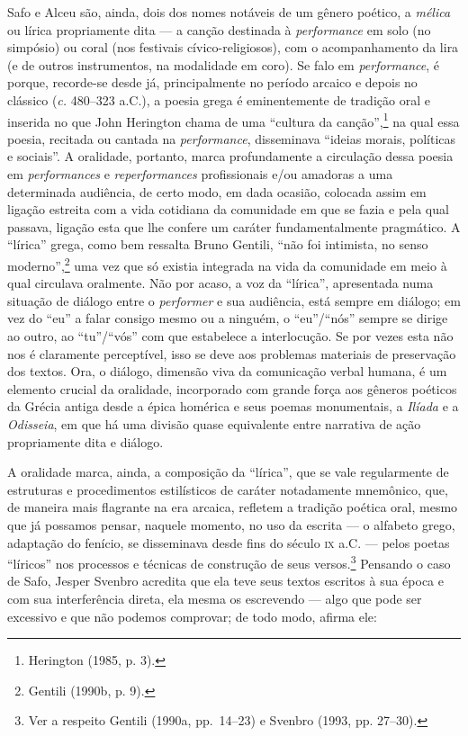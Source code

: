 Safo e Alceu são, ainda, dois dos nomes notáveis de um gênero poético, a
\textit{mélica} ou lírica propriamente dita --- a canção destinada à
\textit{performance} em solo (no simpósio) ou coral (nos festivais
cívico-religiosos), com o acompanhamento da lira (e de outros instrumentos, na
modalidade em coro). Se falo em \textit{performance}, é porque, recorde-se
desde já, principalmente no período arcaico e depois no clássico (\textit{c.}
480--323 a.C.), a poesia grega é eminentemente de tradição oral e inserida no
que John Herington chama de uma “cultura da canção”,\footnote{ Herington (1985, p. 3).} na
qual essa poesia, recitada ou cantada na \textit{performance}, disseminava
“ideias morais, políticas e sociais”. A oralidade, portanto, marca
profundamente a circulação dessa poesia em \textit{performances} e
\textit{reperformances} profissionais e/ou amadoras a uma determinada
audiência, de certo modo, em dada ocasião, colocada assim em ligação estreita
com a vida cotidiana da comunidade em que se fazia e pela qual passava, ligação
esta que lhe confere um caráter fundamentalmente pragmático. A “lírica” grega,
como bem ressalta Bruno Gentili, “não foi intimista, no senso
moderno”,\footnote{ Gentili (1990b, p. 9).} uma vez que só existia integrada na
vida da comunidade em meio à qual
circulava oralmente. Não por acaso, a voz da “lírica”, apresentada numa
situação de diálogo entre o \textit{performer} e sua audiência, está sempre em
diálogo; em vez do “eu” a falar consigo mesmo ou a ninguém, o “eu”/“nós” sempre
se dirige ao outro, ao “tu”/“vós” com que estabelece a interlocução. Se por
vezes esta não nos é claramente perceptível, isso se deve aos problemas
materiais de preservação dos textos. Ora, o diálogo, dimensão viva da
comunicação verbal humana, é um elemento crucial da oralidade, incorporado com
grande força aos gêneros poéticos da Grécia antiga desde a épica homérica e
seus poemas monumentais, a \textit{Ilíada} e a \textit{Odisseia}, em que há uma
divisão quase equivalente entre narrativa de ação propriamente dita e diálogo. 

A oralidade marca, ainda, a composição da “lírica”, que se vale regularmente de
estruturas e procedimentos estilísticos de caráter notadamente mnemônico, que,
de maneira mais flagrante na era arcaica, refletem a tradição poética oral,
mesmo que já possamos pensar, naquele momento, no uso da escrita --- o alfabeto
grego, adaptação do fenício, se disseminava desde fins do século \textsc{ix} a.C. ---
pelos poetas “líricos” nos processos e técnicas de construção de seus
versos.\footnote{ Ver a respeito Gentili (1990a, pp.~14--23) e Svenbro (1993, pp.
27--30).} Pensando o caso de Safo, Jesper Svenbro acredita
que ela teve seus textos escritos à sua época e com sua interferência direta,
ela mesma os escrevendo --- algo que pode ser excessivo e que não podemos
comprovar; de todo modo, afirma ele:

